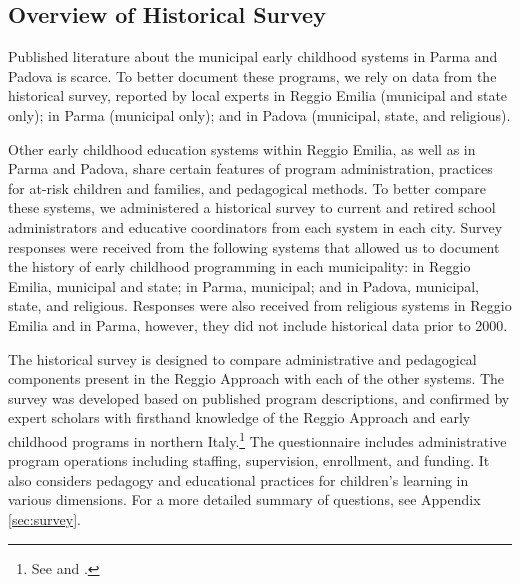 
\subsection{Overview of Historical Survey} \label{sec:survey-overview}
Published literature about the municipal early childhood systems in Parma and Padova is scarce. To better document these programs, we rely on data from the historical survey, reported by local experts in Reggio Emilia (municipal and state only); in Parma (municipal only); and in Padova (municipal, state, and religious).

Other early childhood education systems within Reggio Emilia, as well as in Parma and Padova, share certain features of program administration, practices for at-risk children and families, and pedagogical methods. To better compare these systems, we administered a historical survey to current and retired school administrators and educative coordinators from each system in each city. Survey responses were received from the following systems that allowed us to document the history of early childhood programming in each municipality: in Reggio Emilia, municipal and state; in Parma, municipal; and in Padova, municipal, state, and religious. Responses were also received from religious systems in Reggio Emilia and in Parma, however, they did not include historical data prior to 2000. 

The historical survey is designed to compare administrative and pedagogical components present in the Reggio Approach with each of the other systems. The survey was developed based on published program descriptions, and confirmed by expert scholars with firsthand knowledge of the Reggio Approach and early childhood programs in northern Italy.\footnote{See \citet{Edwards-etal-eds_1998_Hundred-Languages} and \citet{Corsaro_2008_Policy-Practice}.} The questionnaire includes administrative program operations including staffing, supervision, enrollment, and funding. It also considers pedagogy and educational practices for children's learning in various dimensions. For a more detailed summary of questions, see Appendix \ref{sec:survey}.


